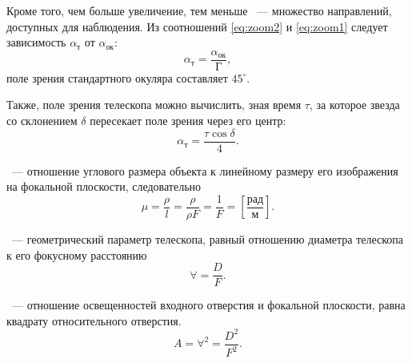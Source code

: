 Кроме того, чем больше увеличение, тем меньше ~--- множество направлений, доступных для наблюдения. Из соотношений \eqref{eq:zoom2} и \eqref{eq:zoom1} следует зависимость  $\alpha_\text{т}$ от  $\alpha_\text{ок}$:
\begin{equation}
	\alpha_\text{т} = \frac{\alpha_\text{ок}}{\text{Г}},
\end{equation}
поле зрения стандартного окуляра составляет $45^\circ$.

Также, поле зрения телескопа можно вычислить, зная время $\tau$, за которое звезда со склонением $\delta$ пересекает поле зрения через его центр:
\begin{equation}
	\alpha_\text{т} = \frac{\tau \cos\delta}{4}.
\end{equation}

~--- отношение углового размера объекта к линейному размеру его изображения на фокальной плоскости, следовательно
\begin{equation}
	\mu = \frac{\rho}{l} = \frac{\rho}{\rho F} = \frac{1}{F}=\left[\frac{\text{рад}}{\text{м}}\right].
\end{equation}

~--- геометрический параметр телескопа, равный отношению диаметра телескопа к его фокусному расстоянию
\begin{equation}
	\forall=\frac{D}{F}.
\end{equation}

~--- отношение освещенностей входного отверстия и фокальной плоскости, равна квадрату относительного отверстия.
\begin{equation}
	A=\forall^2=\frac{D^2}{F^2}.
\end{equation}

